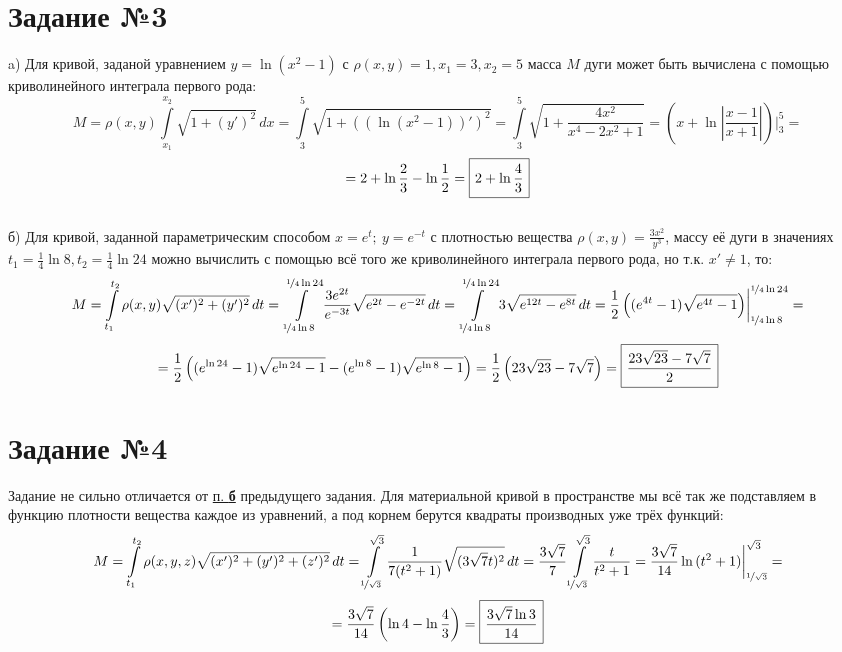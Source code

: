 \documentclass[a3paper,14pt]{extarticle}
\newcommand*\squared[1]{\tikz[baseline=(char.base)]{
            \node[shape=rectangle,draw,inner sep=4pt] (char) {#1};}}
\newcommand{\at}{\biggr\rvert}
\begin{document}
\section*{\centering Задание №3}
a) Для кривой, заданой уравнением $y = \ln(x^2-1)$ с $\rho(x,y) = 1, x_1 = 3, x_2=5$ масса $M$ дуги может быть вычислена с помощью криволинейного интеграла первого рода:
$$M = \rho(x, y)\int\limits_{x_1}^{x_2}\sqrt{1+(y')^2}\,dx = \int\limits_3^5\sqrt{1+\left(\left(\ln(x^2-1)\right)'\right)^2} =  \int\limits_3^5\sqrt{1+\frac{4x^2}{x^4-2x^2+1}} = \left(x + \ln\left|\frac{x-1}{x+1}\right|\right)\at_3^5 = $$
$$ = 2 + \ln\frac{2}{3} - \ln\frac{1}{2} = \squared{$2 + \ln\dfrac{4}{3}$}$$\,\\[1em]
\hypertarget{from4th}{б)} \label{as} Для кривой, заданной параметрическим способом $x=e^t;\ y=e^{-t}$ с плотностью вещества $\rho(x, y) = \frac{3x^2}{y^3}$, массу её дуги в значениях $t_1 = \frac{1}{4}\ln8, t_2=\frac{1}{4}\ln24$ можно вычислить с помощью всё того же криволинейного интеграла первого рода, но т.к. $x' \ne 1$, то:
$$M =  \int\limits_{t_1}^{t_2}\rho(x, y)\sqrt{(x')^2+(y')^2}\,dt = \int\limits_{\nicefrac{1}{4}\ln8}^{\nicefrac{1}{4}\ln24}\frac{3e^{2t}}{e^{-3t}}\sqrt{e^{2t}-e^{-2t}}\,dt = \int\limits_{\nicefrac{1}{4}\ln8}^{\nicefrac{1}{4}\ln24}3\sqrt{e^{12t}-e^{8t}}\,dt = \frac{1}{2}\left((e^{4t}-1)\sqrt{e^{4t}-1}\right)\at_{\nicefrac{1}{4}\ln8}^{\nicefrac{1}{4}\ln24} = $$
$$= \frac{1}{2}\left((e^{\ln{24}}-1)\sqrt{e^{\ln{24}}-1} - (e^{\ln{8}}-1)\sqrt{e^{\ln{8}}-1}\right) = \frac{1}{2}\left( 23\sqrt{23} - 7\sqrt{7}\right) = \squared{$\dfrac{23\sqrt{23}-7\sqrt{7}}{2}$}$$

\section*{\centering Задание №4}
Задание не сильно отличается от \hyperlink{from4th}{п. \textbf{б}} предыдущего задания. Для материальной кривой в пространстве мы всё так же подставляем в функцию плотности вещества каждое из уравнений, а под корнем берутся квадраты производных уже трёх функций:
$$M = \int\limits_{t_1}^{t_2}\rho(x, y, z)\sqrt{(x')^2+(y')^2+(z')^2}\,dt = \int\limits_{\nicefrac{1}{\sqrt{3}}}^{\sqrt{3}}\frac{1}{7(t^2+1)}\sqrt{(3\sqrt{7}t)^2}\,dt = \frac{3\sqrt{7}}{7}\int\limits_{\nicefrac{1}{\sqrt{3}}}^{\sqrt{3}}\frac{t}{t^2+1} = \frac{3\sqrt{7}}{14}\ln{(t^2+1)}\at_{\nicefrac{1}{\sqrt{3}}}^{\sqrt{3}} =$$
$$ = \frac{3\sqrt{7}}{14}\left( \ln{4} - \ln{\frac{4}{3}}\right) = \squared{$\dfrac{3\sqrt{7}\ln{3}}{14}$}$$ \pagebreak\noindent
\end{document}
